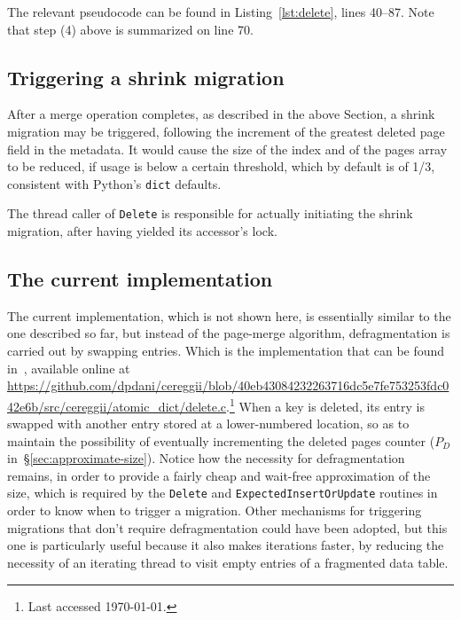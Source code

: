 The relevant pseudocode can be found in Listing~\ref{lst:delete}, lines 40--87.
Note that step (4) above is summarized on line 70.


\subsection{Triggering a shrink migration}\label{subsec:triggering-a-shrink}

After a merge operation completes, as described in the above Section, a shrink migration may be triggered, following the increment of the greatest deleted page field in the metadata.
It would cause the size of the index and of the pages array to be reduced, if usage is below a certain threshold, which by default is of 1/3, consistent with Python's \texttt{dict} defaults.

The thread caller of \texttt{Delete} is responsible for actually initiating the shrink migration, after having yielded its accessor's lock.


\subsection{The current implementation}\label{subsec:the-current-implementation}

The current implementation, which is not shown here, is essentially similar to the one described so far, but instead of the page-merge algorithm, defragmentation is carried out by swapping entries.
Which is the implementation that can be found in~\cite{cereggii}, available online at \url{https://github.com/dpdani/cereggii/blob/40eb43084232263716dc5e7fe753253fdc042e6b/src/cereggii/atomic_dict/delete.c}.\footnote{%
	Last accessed \today.
}
When a key is deleted, its entry is swapped with another entry stored at a lower-numbered location, so as to maintain the possibility of eventually incrementing the deleted pages counter ($P_D$ in~\S\ref{sec:approximate-size}).
Notice how the necessity for defragmentation remains, in order to provide a fairly cheap and wait-free approximation of the size, which is required by the \texttt{Delete} and \texttt{ExpectedInsertOrUpdate} routines in order to know when to trigger a migration.
Other mechanisms for triggering migrations that don't require defragmentation could have been adopted, but this one is particularly useful because it also makes iterations faster, by reducing the necessity of an iterating thread to visit empty entries of a fragmented data table.

